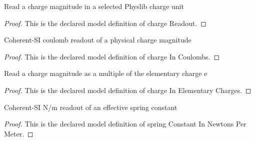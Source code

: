 \begin{definition}
  \label{def:physics:phyx-mini-0658:phyxminiproblems-problemphyxmini0658-chargereadout}
  Read a charge magnitude in a selected Physlib charge unit
\end{definition}
\begin{proof}
  This is the declared model definition of charge Readout.
\end{proof}
\begin{definition}
  \label{def:physics:phyx-mini-0658:phyxminiproblems-problemphyxmini0658-chargeincoulombs}
  Coherent-SI coulomb readout of a physical charge magnitude
\end{definition}
\begin{proof}
  This is the declared model definition of charge In Coulombs.
\end{proof}
\begin{definition}
  \label{def:physics:phyx-mini-0658:phyxminiproblems-problemphyxmini0658-chargeinelementarycharges}
  Read a charge magnitude as a multiple of the elementary charge e
\end{definition}
\begin{proof}
  This is the declared model definition of charge In Elementary Charges.
\end{proof}
\begin{definition}
  \label{def:physics:phyx-mini-0658:phyxminiproblems-problemphyxmini0658-springconstantinnewtonspermeter}
  Coherent-SI N/m readout of an effective spring constant
\end{definition}
\begin{proof}
  This is the declared model definition of spring Constant In Newtons Per Meter.
\end{proof}
